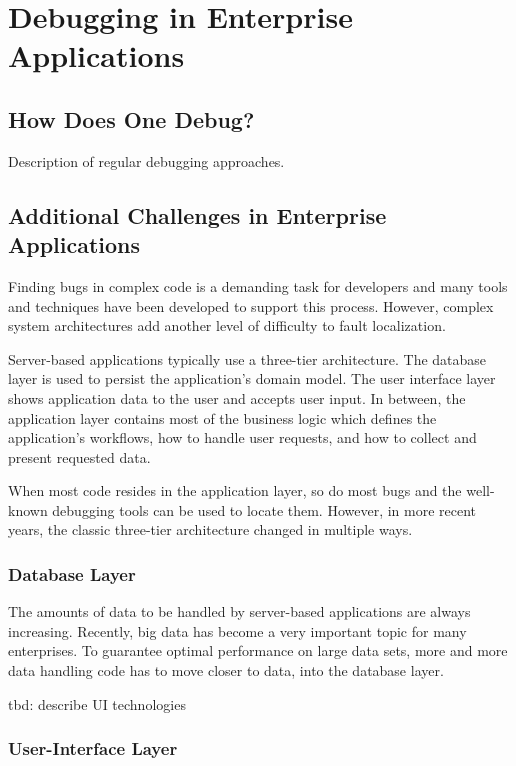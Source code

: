 \chapter{Debugging in Enterprise Applications}

\section{How Does One Debug?}

Description of regular debugging approaches.

\section{Additional Challenges in Enterprise Applications}

Finding bugs in complex code is a demanding task for developers and many tools and techniques have been developed to support this process.
However, complex system architectures add another level of difficulty to fault localization.

Server-based applications typically use a three-tier architecture.
The database layer is used to persist the application's domain model.
The user interface layer shows application data to the user and accepts user input.
In between, the application layer contains most of the business logic which defines the application's workflows, how to handle user requests, and how to collect and present requested data.

When most code resides in the application layer, so do most bugs and the well-known debugging tools can be used to locate them.
However, in more recent years, the classic three-tier architecture changed in multiple ways.

\subsection{Database Layer}

The amounts of data to be handled by server-based applications are always increasing.
Recently, big data has become a very important topic for many enterprises.
To guarantee optimal performance on large data sets, more and more data handling code has to move closer to data, into the database layer.

tbd: describe UI technologies

\subsection{User-Interface Layer}

